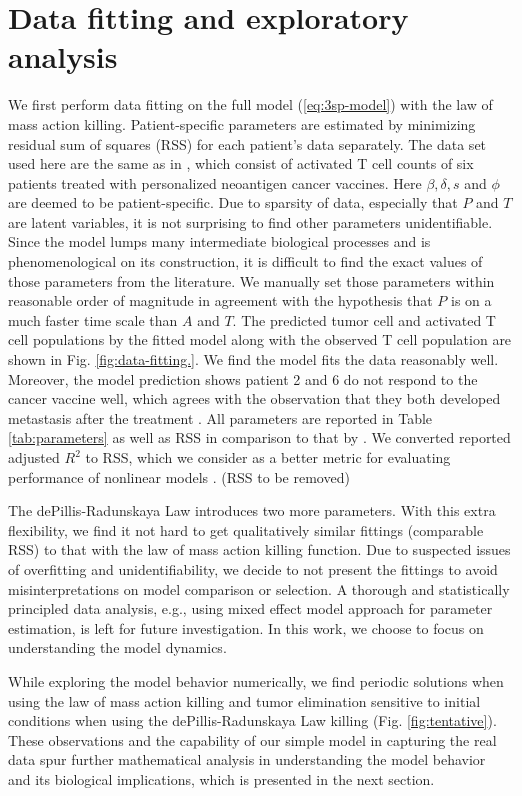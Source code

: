 \documentclass[review,authoryear]{elsarticle}
\begin{document}
\section{Data fitting and exploratory analysis} \label{sec:data}
We first perform data fitting on the full model (\ref{eq:3sp-model}) with the law of mass action killing. Patient-specific parameters are estimated by minimizing residual sum of squares (RSS) for each patient's data separately. The data set used here are the same as in \cite{Messan2021}, which consist of activated T cell counts of six patients treated with personalized neoantigen cancer vaccines. Here $\beta, \delta, s$ and $\phi$ are deemed to be patient-specific. Due to sparsity of data, especially that $P$ and $T$ are latent variables, it is not surprising to find other parameters unidentifiable.  Since the model lumps many intermediate biological processes and is phenomenological on its construction, it is difficult to find the exact values of those parameters from the literature. We manually set those parameters within reasonable order of magnitude in agreement with the hypothesis that $P$ is on a much faster time scale than $A$ and $T$. The predicted tumor cell and activated T cell populations by the fitted model along with the observed T cell population are shown in Fig. \ref{fig:data-fitting.}. We find the model fits the data reasonably well. Moreover, the model prediction shows patient 2 and 6 do not respond to the cancer vaccine well, which agrees with the observation that they both developed metastasis after the treatment \citep{Ott2017}. All parameters are reported in Table \ref{tab:parameters} as well as RSS in comparison to that by \cite{Messan2021}. We converted \cite{Messan2021} reported adjusted $R^2$ to RSS, which we consider as a better metric for evaluating performance of nonlinear models \citep{Spiess2010}. (RSS to be removed)

The dePillis-Radunskaya Law introduces two more parameters. With this extra flexibility, we find it not hard to get qualitatively similar fittings (comparable RSS) to that with the law of mass action killing function. Due to suspected issues of overfitting and unidentifiability, we decide to not present the fittings to avoid misinterpretations on model comparison or selection. A thorough and statistically principled data analysis, e.g., using mixed effect model approach for parameter estimation, is left for future investigation. In this work, we choose to focus on understanding the model dynamics.

While exploring the model behavior numerically, we find periodic solutions when using the law of mass action killing and tumor elimination sensitive to initial conditions when using the dePillis-Radunskaya Law killing (Fig. \ref{fig:tentative}). These observations and the capability of our simple model in capturing the real data spur further mathematical analysis in understanding the model behavior and its biological implications, which is presented in the next section. 
\end{document}
